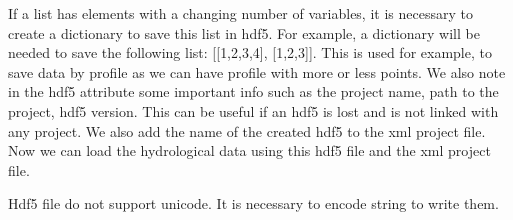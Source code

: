 \documentclass[letterpaper,10pt,english]{sphinxmanual}
\begin{document}
\begin{fulllineitems}
\begin{itemize}
\begin{itemize}
\end{itemize}

\end{itemize}

If a list has elements with a changing number of variables, it is necessary to create a dictionary to save
this list in hdf5. For example, a dictionary will be needed to save the following list: {[}{[}1,2,3,4{]}, {[}1,2,3{]}{]}.
This is used for example, to save data by profile as we can have profile with more or less points. We also note
in the hdf5 attribute some important info such as the project name, path to the project, hdf5 version.
This can be useful if an hdf5 is lost and is not linked with any project. We also add the name of the created
hdf5 to the xml project file. Now we can load the hydrological data using this hdf5 file and the xml project file.

Hdf5 file do not support unicode. It is necessary to encode string to write them.

\end{fulllineitems}

\end{document}
